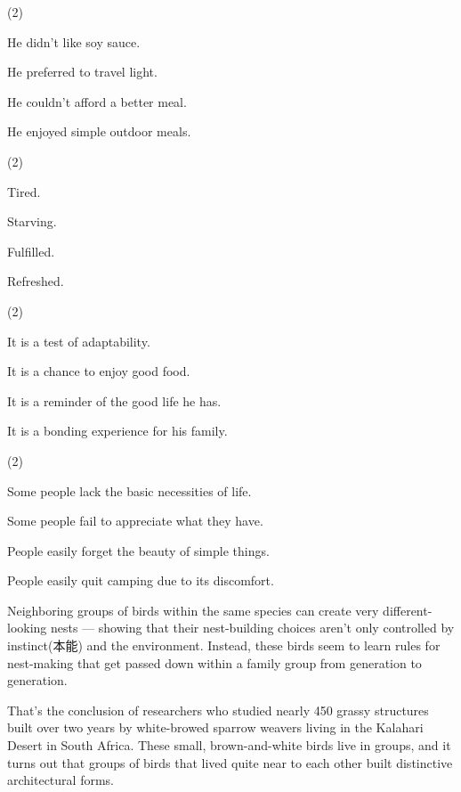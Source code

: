 \documentclass{英语试卷}
\begin{document}
\begin{choices}(2)
  \item He didn't like soy sauce.
  \item He preferred to travel light.
  \item He couldn't afford a better meal.
  \item He enjoyed simple outdoor meals.
\end{choices}
\begin{choices}(2)
  \item Tired.
  \item Starving.
  \item Fulfilled.
  \item Refreshed.
\end{choices}
\begin{choices}(2)
  \item It is a test of adaptability.
  \item It is a chance to enjoy good food.
  \item It is a reminder of the good life he has.
  \item It is a bonding experience for his family.
\end{choices}
\begin{choices}(2)
  \item Some people lack the basic necessities of life.
  \item Some people fail to appreciate what they have.
  \item People easily forget the beauty of simple things.
  \item People easily quit camping due to its discomfort.
\end{choices}
\par Neighboring groups of birds within the same species can create very different-looking nests — showing that their nest-building choices aren't only controlled by instinct(本能) and the environment. Instead, these birds seem to learn rules for nest-making that get passed down within a family group from generation to generation.\par
\par That's the conclusion of researchers who studied nearly 450 grassy structures built over two years by white-browed sparrow weavers living in the Kalahari Desert in South Africa. These small, brown-and-white birds live in groups, and it turns out that groups of birds that lived quite near to each other built distinctive architectural forms.\par
\end{document}
